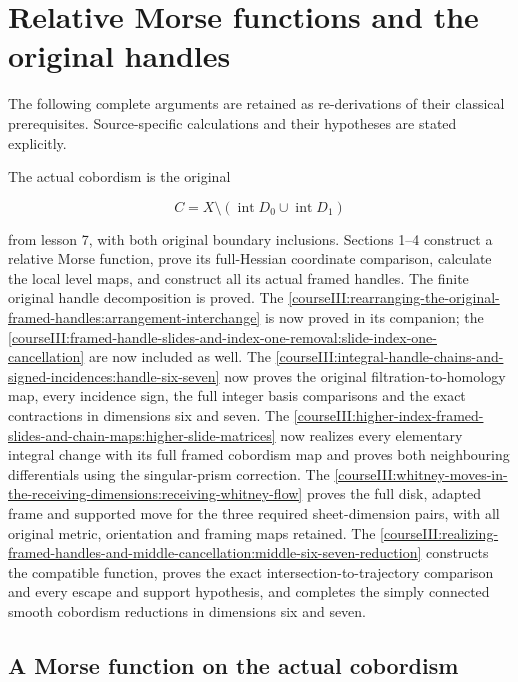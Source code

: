 \section{Relative Morse functions and the original handles}\label{courseIII:relative-morse-functions-and-original-handles:section}

The following complete arguments are retained as re-derivations of their classical prerequisites. Source-specific calculations and their hypotheses are stated explicitly.

The actual cobordism is the original

\[
C=X\setminus(\operatorname{int}D_0\cup\operatorname{int}D_1)
\]

from lesson 7, with both original boundary inclusions. Sections 1--4 construct a relative Morse function, prove its full-Hessian coordinate comparison, calculate the local level maps, and construct all its actual framed handles. The finite original handle decomposition is proved. The \cref{courseIII:rearranging-the-original-framed-handles:arrangement-interchange} is now proved in its companion; the \cref{courseIII:framed-handle-slides-and-index-one-removal:slide-index-one-cancellation} are now included as well. The \cref{courseIII:integral-handle-chains-and-signed-incidences:handle-six-seven} now proves the original filtration-to-homology map, every incidence sign, the full integer basis comparisons and the exact contractions in dimensions six and seven. The \cref{courseIII:higher-index-framed-slides-and-chain-maps:higher-slide-matrices} now realizes every elementary integral change with its full framed cobordism map and proves both neighbouring differentials using the singular-prism correction. The \cref{courseIII:whitney-moves-in-the-receiving-dimensions:receiving-whitney-flow} proves the full disk, adapted frame and supported move for the three required sheet-dimension pairs, with all original metric, orientation and framing maps retained. The \cref{courseIII:realizing-framed-handles-and-middle-cancellation:middle-six-seven-reduction} constructs the compatible function, proves the exact intersection-to-trajectory comparison and every escape and support hypothesis, and completes the simply connected smooth cobordism reductions in dimensions six and seven.

\subsection{A Morse function on the actual cobordism}
\label{courseIII:relative-morse-functions-and-original-handles:relative-morse-existence}

